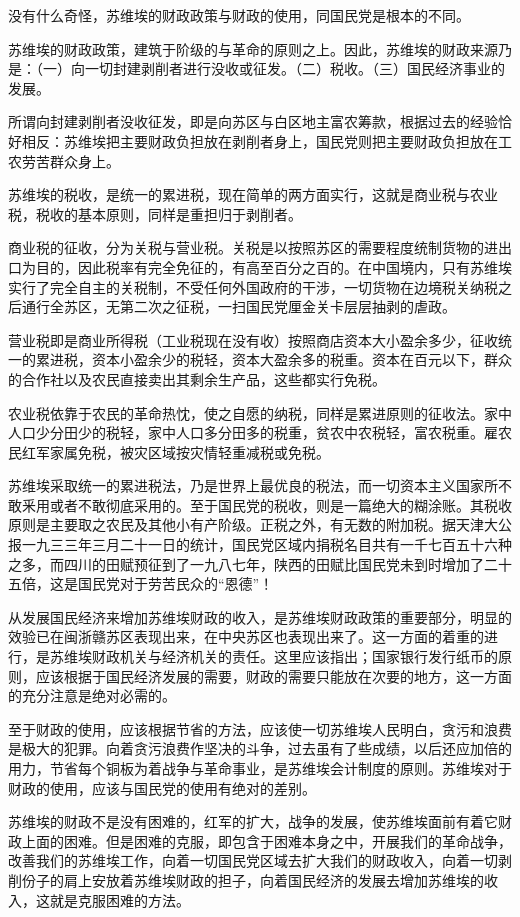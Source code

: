 没有什么奇怪，苏维埃的财政政策与财政的使用，同国民党是根本的不同。

苏维埃的财政政策，建筑于阶级的与革命的原则之上。因此，苏维埃的财政来源乃是：（一）向一切封建剥削者进行没收或征发。（二）税收。（三）国民经济事业的发展。

所谓向封建剥削者没收征发，即是向苏区与白区地主富农筹款，根据过去的经验恰好相反：苏维埃把主要财政负担放在剥削者身上，国民党则把主要财政负担放在工农劳苦群众身上。

苏维埃的税收，是统一的累进税，现在简单的两方面实行，这就是商业税与农业税，税收的基本原则，同样是重担归于剥削者。

商业税的征收，分为关税与营业税。关税是以按照苏区的需要程度统制货物的进出口为目的，因此税率有完全免征的，有高至百分之百的。在中国境内，只有苏维埃实行了完全自主的关税制，不受任何外国政府的干涉，一切货物在边境税关纳税之后通行全苏区，无第二次之征税，一扫国民党厘金关卡层层抽剥的虐政。

营业税即是商业所得税（工业税现在没有收）按照商店资本大小盈余多少，征收统一的累进税，资本小盈余少的税轻，资本大盈余多的税重。资本在百元以下，群众的合作社以及农民直接卖出其剩余生产品，这些都实行免税。

农业税依靠于农民的革命热忱，使之自愿的纳税，同样是累进原则的征收法。家中人口少分田少的税轻，家中人口多分田多的税重，贫农中农税轻，富农税重。雇农民红军家属免税，被灾区域按灾情轻重减税或免税。

苏维埃采取统一的累进税法，乃是世界上最优良的税法，而一切资本主义国家所不敢釆用或者不敢彻底采用的。至于国民党的税收，则是一篇绝大的糊涂账。其税收原则是主要取之农民及其他小有产阶级。正税之外，有无数的附加税。据天津大公报一九三三年三月二十一日的统计，国民党区域内捐税名目共有一千七百五十六种之多，而四川的田赋预征到了一九八七年，陕西的田赋比国民党未到时增加了二十五倍，这是国民党对于劳苦民众的“恩德”！

从发展国民经济来增加苏维埃财政的收入，是苏维埃财政政策的重要部分，明显的效验已在闽浙赣苏区表现出来，在中央苏区也表现出来了。这一方面的着重的进行，是苏维埃财政机关与经济机关的责任。这里应该指出；国家银行发行纸币的原则，应该根据于国民经济发展的需要，财政的需要只能放在次要的地方，这一方面的充分注意是绝对必需的。

至于财政的使用，应该根据节省的方法，应该使一切苏维埃人民明白，贪污和浪费是极大的犯罪。向着贪污浪费作坚决的斗争，过去虽有了些成绩，以后还应加倍的用力，节省每个铜板为着战争与革命事业，是苏维埃会计制度的原则。苏维埃对于财政的使用，应该与国民党的使用有绝对的差别。

苏维埃的财政不是没有困难的，红军的扩大，战争的发展，使苏维埃面前有着它财政上面的困难。但是困难的克服，即包含于困难本身之中，开展我们的革命战争，改善我们的苏维埃工作，向着一切国民党区域去扩大我们的财政收入，向着一切剥削份子的肩上安放着苏维埃财政的担子，向着国民经济的发展去增加苏维埃的收入，这就是克服困难的方法。

